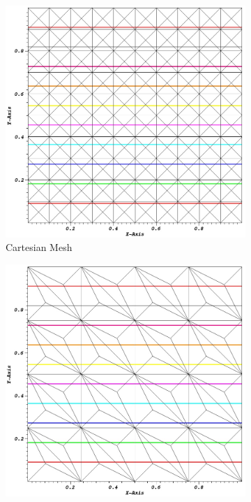 \documentclass{anstrans}
\begin{document}
\begin{figure}[]
\centering
\begin{subfigure}{.5\textwidth}
	\centering
	\includegraphics[scale=0.28]{visit0005.jpg}
	\caption{Cartesian Mesh}
	\label{fig::cart_lin_sol}
\end{subfigure}
\begin{subfigure}{.5\textwidth}
	\centering
	\includegraphics[scale=0.28]{visit0006.jpg}

\end{subfigure}
\end{figure}
\end{document}

